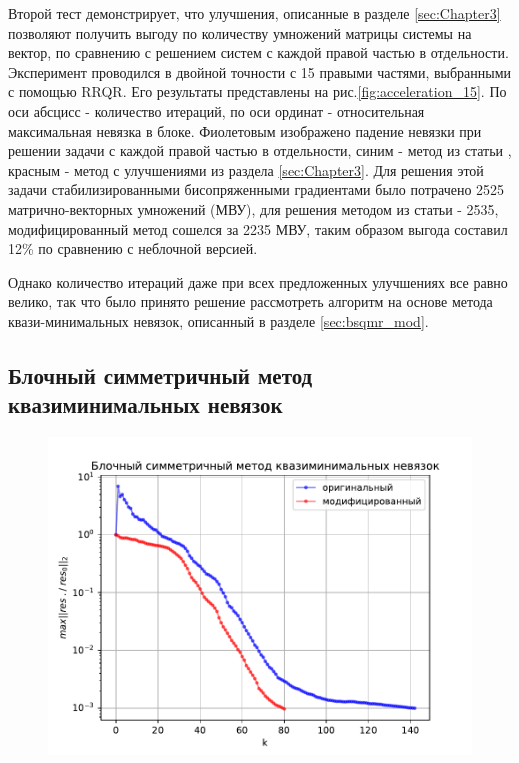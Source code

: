 \par Второй тест демонстрирует, что улучшения, описанные в разделе \ref{sec:Chapter3} позволяют получить выгоду по количеству умножений матрицы системы на вектор,
по сравнению с решением систем с каждой правой частью в отдельности. Эксперимент проводился в двойной точности с 15 правыми частями,
выбранными с помощью RRQR. Его результаты представлены на рис.\ref{fig:acceleration_15}. По оси абсцисс - количество итераций, по оси
ординат - относительная максимальная невязка в блоке. Фиолетовым изображено падение невязки при решении задачи с каждой правой частью 
в отдельности, синим - метод из статьи \cite{elGuennouni2003}, красным - метод с улучшениями из раздела \ref{sec:Chapter3}. Для решения этой задачи
стабилизированными бисопряженными градиентами было потрачено 2525 матрично-векторных умножений (МВУ), для решения методом из статьи \cite{elGuennouni2003} - 2535, модифицированный
метод сошелся за 2235 МВУ, таким образом выгода составил 12\% по сравнению с неблочной версией.

\par Однако количество итераций даже при всех предложенных улучшениях все равно велико, так что
было принято решение рассмотреть алгоритм на основе метода квази-минимальных невязок, описанный 
в разделе \ref{sec:bsqmr_mod}. 

\subsection{Блочный симметричный метод квазиминимальных невязок}

\begin{figure}[H]
    \centering
    \includegraphics[width=0.7\linewidth]{images/bsqmr_reorth2_base_double_45.pdf}
    \caption{}
    \label{fig:bsqmr_reorth2_base_double_45}
\end{figure}

